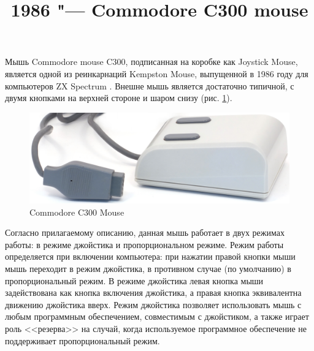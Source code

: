 \documentclass[11pt, a4paper]{article}
\begin{document}
\title{1986 "--- Commodore C300 mouse}
\date{}
\maketitle

Мышь Commodore mouse C300, подписанная на коробке как Joystick Mouse, является одной из реинкарнаций Kempston Mouse, выпущенной в 1986 году для компьютеров ZX Spectrum \cite{SinclairUser}. Внешне мышь является достаточно типичной, с двумя кнопками на верхней стороне и шаром снизу (рис. \ref{fig:C300Pic}).

\begin{figure}[h]
    \centering
    \includegraphics[scale=0.7]{1986_commodore_c300_mouse/cmnirm_30.jpg}
    \caption{Commodore C300 Mouse}
    \label{fig:C300Pic}
\end{figure}

Согласно прилагаемому описанию, данная мышь работает в двух режимах работы: в режиме джойстика и пропорциональном режиме. Режим работы определяется при включении компьютера: при нажатии правой кнопки мыши мышь переходит в режим джойстика, в противном случае (по умолчанию) в пропорциональный режим. В режиме джойстика левая кнопка мыши задействована как кнопка включения джойстика, а правая кнопка эквивалентна движению джойстика вверх. Режим джойстика позволяет использовать мышь с любым программным обеспечением, совместимым с джойстиком, а также играет роль <<резерва>> на случай, когда используемое программное обеспечение не поддерживает пропорциональный режим.
\end{document}
